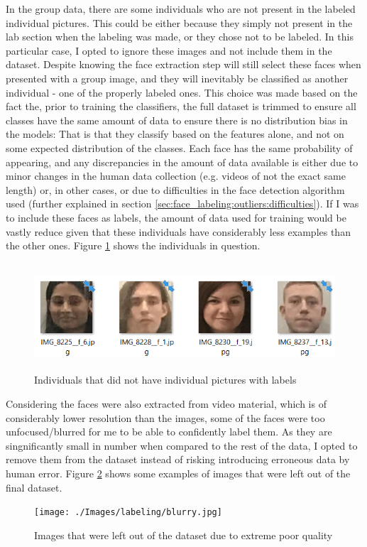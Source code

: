 \documentclass[11pt]{article}
\begin{document}
        \label{sec:face_labeling:outliers:unlabeled}
            In the group data, there are some individuals who are not present in the labeled individual pictures. This could be either because they simply not present in the lab section when the labeling was made, or they chose not to be labeled. In this particular case, I opted to ignore these images and not include them in the dataset. Despite knowing the face extraction step will still select these faces when presented with a group image, and they will inevitably be classified as another individual - one of the properly labeled ones. This choice was made based on the fact the, prior to training the classifiers, the full dataset is trimmed to ensure all classes have the same amount of data to ensure there is no distribution bias in the models: That is that they classify based on the features alone, and not on some expected distribution of the classes. Each face has the same probability of appearing, and any discrepancies in the amount of data available is either due to minor changes in the human data collection (e.g. videos of not the exact same length) or, in other cases, or due to difficulties in the face detection algorithm used (further explained in section \ref{sec:face_labeling:outliers:difficulties}). If I was to include these faces as labels, the amount of data used for training would be vastly reduce given that these individuals have considerably less examples than the other ones. Figure \ref{fig:label:unlabeled_inds} shows the individuals in question.
            \begin{figure}[ht]
                \centering
                \includegraphics[height=4cm]{./Images/labeling/unlabeled_inds.png}
                \caption{Individuals that did not have individual pictures with labels}
                \label{fig:label:unlabeled_inds}
            \end{figure}

            Considering the faces were also extracted from video material, which is of considerably lower resolution than the images, some of the faces were too unfocused/blurred for me to be able to confidently label them. As they are singnificantly small in number when compared to the rest of the data, I opted to remove them from the dataset instead of risking introducing erroneous data by human error. Figure \ref{fig:label:blurry} shows some examples of images that were left out of the final dataset.
            \begin{figure}[ht]
                \centering
                \texttt{[image: ./Images/labeling/blurry.jpg]}
                \caption{Images that were left out of the dataset due to extreme poor quality}
                \label{fig:label:blurry}
            \end{figure}
\end{document}
